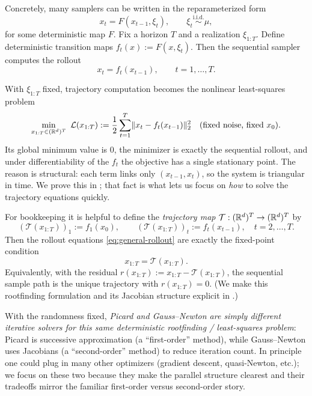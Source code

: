 \documentclass[11pt]{article}
\begin{document}
Concretely, many samplers can be written in the reparameterized form
\begin{equation}
  x_t = F(x_{t-1},\xi_t),
  \qquad \xi_t \stackrel{\text{i.i.d.}}{\sim} \mu,
  \label{eq:reparam-rollout}
\end{equation}
for some deterministic map $F$.
Fix a horizon $T$ and a realization $\xi_{1:T}$.
Define deterministic transition maps $f_t(x):=F(x,\xi_t)$.
Then the sequential sampler computes the rollout
\begin{equation}
  x_t = f_t(x_{t-1}),\qquad t=1,\dots,T.
  \label{eq:general-rollout}
\end{equation}

With $\xi_{1:T}$ fixed, trajectory computation becomes the nonlinear least-squares problem
\[
\min_{x_{1:T}\in(\R^d)^T}\ \mathcal{L}(x_{1:T})
:=\frac12\sum_{t=1}^T \norm{x_t-f_t(x_{t-1})}_2^2
\quad\text{(fixed noise, fixed $x_0$).}
\]
Its global minimum value is $0$, the minimizer is exactly the sequential rollout, and under differentiability of the $f_t$ the objective has a single stationary point.
The reason is structural: each term links only $(x_{t-1},x_t)$, so the system is triangular in time.
We prove this in ; that fact is what lets us focus on \emph{how} to solve the trajectory equations quickly.

For bookkeeping it is helpful to define the \emph{trajectory map} $\mathcal{T}:(\mathbb{R}^d)^T\to(\mathbb{R}^d)^T$ by
\[
(\mathcal{T}(x_{1:T}))_1 := f_1(x_0),\qquad
(\mathcal{T}(x_{1:T}))_t := f_t(x_{t-1}),\quad t=2,\dots,T.
\]
Then the rollout equations \eqref{eq:general-rollout} are exactly the fixed-point condition
\[
  x_{1:T}=\mathcal{T}(x_{1:T}).
\]
Equivalently, with the residual $r(x_{1:T}) := x_{1:T}-\mathcal{T}(x_{1:T})$, the sequential sample path is the unique trajectory with $r(x_{1:T})=0$.
(We make this rootfinding formulation and its Jacobian structure explicit in .)

With the randomness fixed, \emph{Picard and Gauss--Newton are simply different iterative solvers for this same deterministic rootfinding / least-squares problem}:
Picard is successive approximation (a ``first-order'' method), while Gauss--Newton uses Jacobians (a ``second-order'' method) to reduce iteration count.
In principle one could plug in many other optimizers (gradient descent, quasi-Newton, etc.);
we focus on these two because they make the parallel structure clearest and their tradeoffs mirror the familiar first-order versus second-order story.
\end{document}
